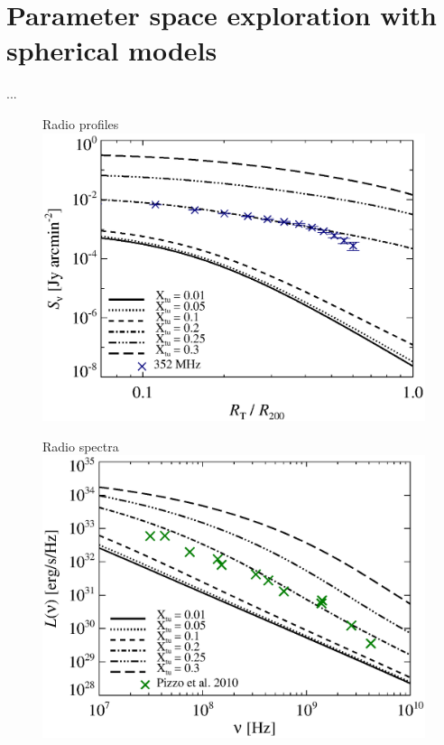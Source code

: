 \documentclass[a4paper,fleqn,usenatbib]{mnras}
\begin{document}
\section{Parameter space exploration with spherical models}
...
\begin{figure}
\begin{minipage}{1\columnwidth}
   \begin{center}\Large{Radio profiles}\\
     \includegraphics[width=\columnwidth]{prof.comp.KrTTDth.Xtu.eps}
   \end{center}
\end{minipage}
\begin{minipage}{1\columnwidth}
   \begin{center}\Large{Radio spectra}\\
     \includegraphics[width=\columnwidth]{spec.comp.KrTTDth.Xtu.eps}

\end{center}
\end{minipage}
\end{figure}
\end{document}
